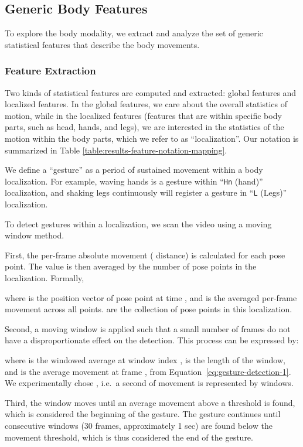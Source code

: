 \subsection{Generic Body Features} \label{sec:meta_gesture_feature_extraction}


To explore the body modality, we extract and analyze the set of generic statistical features that describe the body movements.
\subsubsection{Feature Extraction}
Two kinds of statistical features are computed and extracted: global features and localized features.
In the global features, we care about the overall statistics of motion, while in the localized features (features that are within specific body parts, such as head, hands, and legs), we are interested in the statistics of the motion within the body parts, which we refer to as ``localization''. Our notation is summarized in Table \ref{table:results-feature-notation-mapping}.

We define a ``gesture'' as a period of sustained movement within a body localization. For example, waving hands is a gesture within ``\texttt{Hn} (hand)'' localization, and shaking legs continuously will register a gesture in ``\texttt{L} (Legs)'' localization.

To detect gestures within a localization, we scan the video using a moving window method.


First, the per-frame absolute movement ( distance) is calculated for each pose point.
The value is then averaged by the number of pose points in the localization.
Formally,

where  is the position
vector of pose point  at time , and  is the averaged per-frame movement across all points.  are the collection of pose points in this localization.

Second, a moving window is applied such that a small number of frames do not have a
disproportionate effect on the detection. This process can be expressed by:

where  is the windowed average at window index ,  is the length of the window, and
 is the average movement at frame , from Equation~\ref{eq:gesture-detection-1}.
We experimentally chose , i.e.\ a second of movement is represented by  windows.

Third, the window moves until an average movement
above a threshold is found, which is considered the beginning of the gesture.
The gesture continues until  consecutive windows (30 frames, approximately 1 sec) are found below the movement threshold, which is thus considered the end of the gesture.



